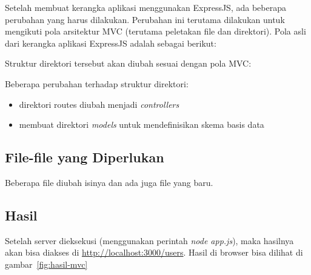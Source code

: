 Setelah membuat kerangka aplikasi menggunakan ExpressJS, ada beberapa perubahan yang harus dilakukan. Perubahan ini terutama dilakukan untuk mengikuti pola arsitektur MVC (terutama peletakan file dan direktori). Pola asli dari kerangka aplikasi ExpressJS adalah sebagai berikut:

\lstset{language=Bash,caption=Struktur direktori asli aplikasi ExpressJS}


Struktur direktori tersebut akan diubah sesuai dengan pola MVC:

\lstset{language=Bash,caption=Struktur direktori ExpressJS sesuai pola MVC}


Beberapa perubahan terhadap struktur direktori:
\begin{itemize}
	\item direktori routes diubah menjadi \textit{controllers}
	\item membuat direktori \textit{models} untuk mendefinisikan skema basis data
\end{itemize}

\subsection{File-file yang Diperlukan}

Beberapa file diubah isinya dan ada juga file yang baru. 

\lstset{language=JavaScript,caption=app.js}


\lstset{language=JavaScript,caption=controllers/user.js}


\lstset{language=JavaScript,caption=models/db.js}


\lstset{language=JavaScript,caption=package.json}


\subsection{Hasil}

Setelah server dieksekusi (menggunakan perintah \textit{node app.js}), maka hasilnya akan bisa diakses di \url{http://localhost:3000/users}. Hasil di browser bisa dilihat di gambar~\ref{fig:hasil-mvc}

